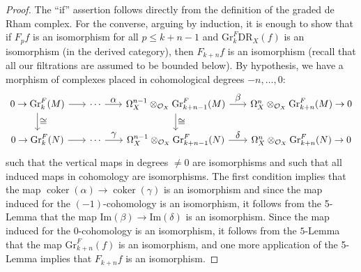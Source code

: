 \documentclass[JEP,XML,SOM,Unicode]{cedram}
\let\ra\raightarrow
\let\ra\rightarrow
\let\ts\textstyle
\theoremstyle{plain}
\theoremstyle{definition}
\newcommand\cO{\mathcal{O}}
\newcommand\cO{\mathcal{O}}
\newcommand\gr{\mathrm{Gr}}
\newcommand\DR{\mathrm{DR}}
\DeclareMathOperator{\coker}{coker}
\begin{document}
\begin{proof}
The ``if'' assertion follows directly from the definition of the graded de Rham complex. For the converse, arguing by induction, it is enough to show that if $F_pf$ is an isomorphism
for all $p\leq k+n-1$ and $\gr^F_{k}\DR_X(f)$ is an isomorphism (in the derived category), then $F_{k+n}f$ is an isomorphism
(recall that all our filtrations are assumed to be bounded below).
By hypothesis, we have a morphism of complexes placed in cohomological degrees $-n,\ldots,0$:
\[
\begin{tikzcd}[column sep=scriptsize]
0\ra \gr^F_k(M) \arrow{r}\arrow{d}{\ts\cong} & \cdots \arrow[r, "\ts\alpha"] & \Omega^{n-1}_X\otimes_{\cO_X}\gr_{k+n-1}^F(M) \arrow[r, "\ts\beta"]\arrow{d}{\ts\cong} & \Omega^n_X\otimes_{\cO_X} \gr^F_{k+n}(M)\ra 0 \\
0\ra \gr^F_k(N) \arrow{r} & \cdots \arrow[r, "\ts\gamma"] & \Omega^{n-1}_X\otimes_{\cO_X} \gr^F_{k+n-1}(N) \arrow[r, "\ts\delta"] & \Omega^n_X\otimes_{\cO_X} \gr^F_{k+n}(N) \ra 0
\end{tikzcd}
\]
such that the vertical maps in degrees $\neq 0$ are isomorphisms and such that all induced maps in cohomology are isomorphisms.
The first condition implies that the map $\coker(\alpha)\to \coker(\gamma)$ is an isomorphism and since
the map induced for the $(-1)$-cohomology is an isomorphism, it follows from the 5-Lemma that the map $\mathrm{Im}(\beta)\to \mathrm{Im}(\delta)$ is an isomorphism.
Since the map induced for the $0$-cohomology is an isomorphism, it follows from the $5$-Lemma
that the map $\gr^F_{k+n}(f)$ is an isomorphism, and one more application of the 5-Lemma
implies that $F_{k+n}f$ is an isomorphism.
\end{proof}
\end{document}
